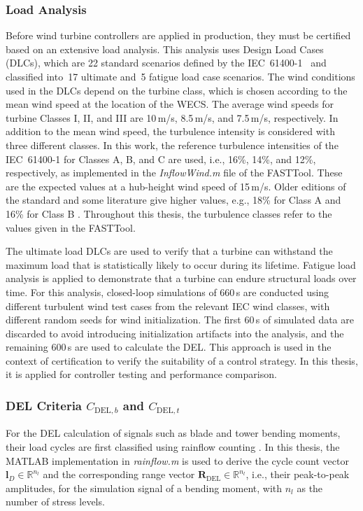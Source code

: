 \subsubsection{Load Analysis}
Before wind turbine controllers are applied in production, they must be certified based on an extensive load analysis. This analysis uses Design Load Cases (DLCs), which are 22 standard scenarios defined by the IEC~61400-1~\cite{IEC61400-1} and classified into~17 ultimate and~5 fatigue load case scenarios. The wind conditions used in the DLCs depend on the turbine class, which is chosen according to the mean wind speed at the location of the WECS. The average wind speeds for turbine Classes I, II, and III are 10\,m/s, 8.5\,m/s, and 7.5\,m/s, respectively. In addition to the mean wind speed, the turbulence intensity is considered with three different classes. In this work, the reference turbulence intensities of the IEC~61400-1 for Classes A, B, and C are used, i.e., 16\%, 14\%, and 12\%, respectively, as implemented in the \textit{InflowWind.m} file of the FASTTool. These are the expected values at a hub-height wind speed of 15\,m/s. Older editions of the standard and some literature give higher values, e.g., 18\% for Class A and 16\% for Class B \cite{gasch2011wind}. Throughout this thesis, the turbulence classes refer to the values given in the FASTTool.

The ultimate load DLCs are used to verify that a turbine can withstand the maximum load that is statistically likely to occur during its lifetime. Fatigue load analysis is applied to demonstrate that a turbine can endure structural loads over time. For this analysis, closed-loop simulations of 660\,s are conducted using different turbulent wind test cases from the relevant IEC wind classes, with different random seeds for wind initialization. The first 60\,s of simulated data are discarded to avoid introducing initialization artifacts into the analysis, and the remaining 600\,s are used to calculate the DEL. This approach is used in the context of certification to verify the suitability of a control strategy. In this thesis, it is applied for controller testing and performance comparison.


\subsubsection{DEL Criteria $C_{\text{DEL},b}$ and $C_{\text{DEL},t}$}

For the DEL calculation of signals such as blade and tower bending moments, their load cycles are first classified using rainflow counting \cite{matsuishi1968fatigue}. In this thesis, the MATLAB implementation in \textit{rainflow.m} is used to derive the cycle count vector $\bm{l}_D \in \mathbb{R}^{n_l }$ and the corresponding range vector $\bm{R}_{\text{DEL}}\in \mathbb{R}^{n_l }$, i.e., their peak-to-peak amplitudes, for the simulation signal of a bending moment, with $n_l$ as the number of stress levels. 


